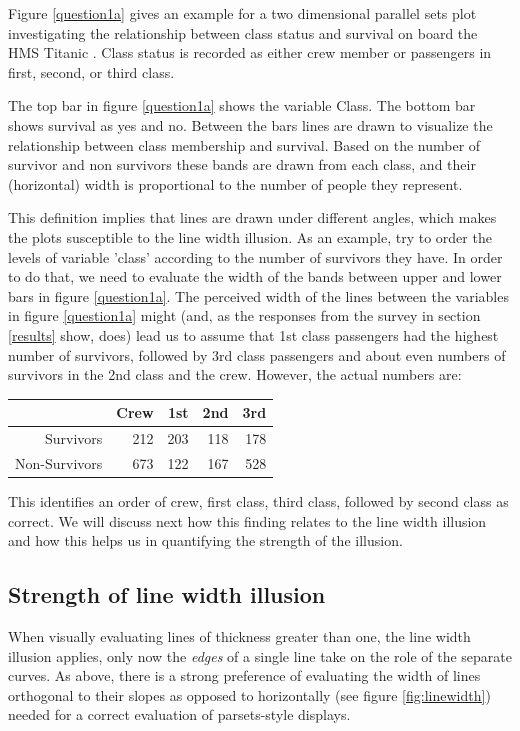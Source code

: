 Figure \ref{question1a} gives an example for a two dimensional parallel sets plot investigating the relationship between class status and survival on board the HMS Titanic  \citep{dawson:1995}. Class status is recorded as either crew member or passengers in  first, second, or third class. 

 The top bar in figure \ref{question1a} shows the  variable Class. The bottom bar shows survival  as yes and no. Between the bars lines are drawn to visualize the relationship between class membership and  survival. 
  Based on the number of survivor and non survivors
  these bands are drawn from each class, and their (horizontal) width is proportional to the number of people they represent. 

This definition implies that lines are drawn under different angles, which makes the plots susceptible to the line width illusion. As an example, try to order the levels of variable 'class'  according to the number of survivors they have. In order to do that, we need to evaluate the width of the bands between upper and lower bars in figure \ref{question1a}.
The  perceived width of the lines between the variables in figure \ref{question1a} might  (and, as the responses from the survey in section \ref{results} show, does) lead us to assume that 1st class passengers had the highest number of survivors, followed by 3rd class passengers and about even numbers of survivors in the 2nd class  and  the crew. However, the  actual numbers are:
%
\begin{center}
\begin{tabular}{rrrrr}
& Crew & 1st & 2nd & 3rd \\ \hline
Survivors & 212 & 203 & 118 & 178\\
Non-Survivors & 673 & 122 & 167 &  528  
\end{tabular}
\end{center}
This identifies an order of crew, first class, third class, followed by second class as correct. 
We will discuss next how this finding relates to the line width illusion and how this helps us in quantifying the strength of the illusion.



%
\subsection{Strength of  line width illusion}\label{distortion}

When visually evaluating lines of thickness greater than one, the line width illusion applies, only now the {\it edges} of a single line  take on the role of the separate curves. %
As above, there is a strong preference of evaluating the width of lines orthogonal to their slopes as opposed to horizontally (see figure \ref{fig:linewidth})  needed for a correct  evaluation of parsets-style displays.

